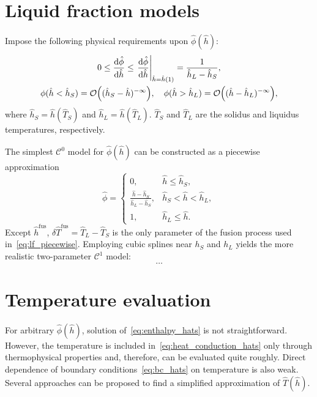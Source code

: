 \documentclass{article}
\newcommand{\fusion}[1]{{#1}^\mathrm{fus}}
\begin{document}

\section{Liquid fraction models}

Impose the following physical requirements upon \(\hat\phi(\hat{h})\):
\begin{gather}
    0 \leq \dv{\hat\phi}{\hat{h}} \leq \eval{\dv{\hat\phi}{\hat{h}}}_{\hat{h}=\hat{h}(1)} =
        \frac1{\hat{h}_L-\hat{h}_S}, \label{eq:lf_monotonic}\\
	\phi(\hat{h}<\hat{h}_S) = \order{(\hat{h}_S-\hat{h})^{-\infty}}, \quad
	    \phi(\hat{h}>\hat{h}_L) = \order{(\hat{h}-\hat{h}_L)^{-\infty}}, \label{eq:lf_exp_decay}
\end{gather}
where \(\hat{h}_S = \hat{h}(\hat{T}_S)\) and \(\hat{h}_L = \hat{h}(\hat{T}_L)\).
\(\hat{T}_S\) and \(\hat{T}_L\) are the solidus and liquidus temperatures, respectively.

The simplest \(\mathcal{C}^0\) model for \(\hat{\phi}(\hat{h})\) can be constructed as a piecewise approximation
\begin{equation}\label{eq:lf_piecewise}
	\hat{\phi} = \begin{cases}
        0,                                             & \hat{h} \leq \hat{h}_S, \\
        \frac{\hat{h}-\hat{h}_S}{\hat{h}_L-\hat{h}_S}, & \hat{h}_S < \hat{h} < \hat{h}_L, \\
        1,                                             & \hat{h}_L \leq \hat{h}.
    \end{cases}
\end{equation}
Except \(\fusion{\hat{h}}\), \(\delta\fusion{\hat{T}} = \hat{T}_L - \hat{T}_S\)
is the only parameter of the fusion process  used in~\eqref{eq:lf_piecewise}.
Employing cubic splines near \(h_S\) and \(h_L\) yields the more realistic two-parameter \(\mathcal{C}^1\) model:
\begin{equation}\label{eq:lf_splines}
	\dots
\end{equation}

\section{Temperature evaluation}

For arbitrary \(\hat{\phi}(\hat{h})\), solution of~\eqref{eq:enthalpy_hats} is not straightforward.
However, the temperature is included in~\eqref{eq:heat_conduction_hats} only through thermophysical properties
and, therefore, can be evaluated quite roughly.
Direct dependence of boundary conditions~\eqref{eq:bc_hats} on temperature is also weak.
Several approaches can be proposed to find a simplified approximation of \(\hat{T}(\hat{h})\).
\end{document}
